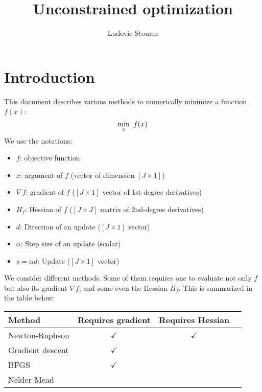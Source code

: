 \documentclass[12pt]{article}
\title{Unconstrained optimization}
\author{Ludovic Stourm}
\begin{document}
\maketitle

\section{Introduction}
This document describes various methods to numerically minimize a function $f(x)$:
\begin{equation}
	\underset{x}{\min} \hspace*{5pt} f(x)
\end{equation}
We use the notations:
\begin{itemize}
	\item $f$: objective function
	\item $x$: argument of $f$ (vector of dimension $[J \times 1]$)
	\item $\nabla f$: gradient of $f$ ($[J \times 1]$ vector of 1st-degree derivatives)
	\item $H_f$: Hessian of $f$ ($[J \times J]$ matrix of 2nd-degree derivatives)
	\item $d$: Direction of an update ($[J \times 1]$ vector)
	\item $\alpha$: Step size of an update (scalar)
	\item $s = \alpha d$: Update ($[J \times 1]$ vector)
\end{itemize}
\vspace*{15pt}
We consider different methods. Some of them requires one to evaluate not only $f$ but also its gradient $\nabla f$, and some even the Hessian $H_f$. This is summarized in the table below:
\begin{center}
\begin{tabular}{|l|c|c|c}
	\hline
	Method & Requires gradient & Requires Hessian  \\ \hline
	Newton-Raphson		& $\checkmark$  & $\checkmark$   \\
	Gradient descent		& $\checkmark$  &  \\
	BFGS				& $\checkmark$  &  \\
	Nelder-Mead			&   &  \\
	\hline
\end{tabular}
\end{center}
\end{document}
